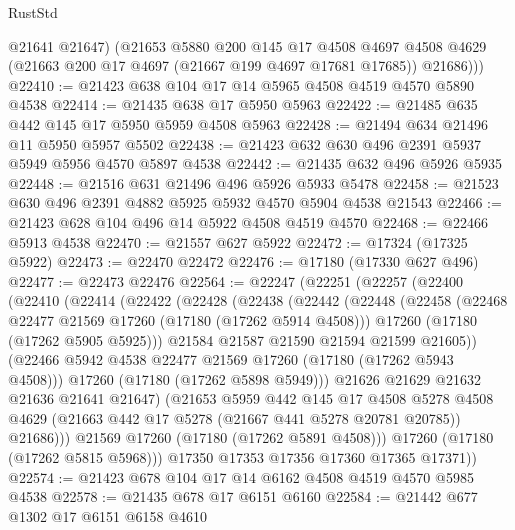 \begin{lexlean}{RustStd}
\begin{coremodule}
          @21641
          @21647)
        (@21653
          @5880
          @200
          @145
          @17
          @4508
          @4697
          @4508
          @4629
          (@21663 @200 @17 @4697 (@21667 @199 @4697 @17681 @17685))
          @21686)))
@22410 := @21423 @638 @104 @17 @14 @5965 @4508 @4519 @4570 @5890 @4538
@22414 := @21435 @638 @17 @5950 @5963
@22422 := @21485 @635 @442 @145 @17 @5950 @5959 @4508 @5963
@22428 := @21494 @634 @21496 @11 @5950 @5957 @5502
@22438 := @21423 @632 @630 @496 @2391 @5937 @5949 @5956 @4570 @5897 @4538
@22442 := @21435 @632 @496 @5926 @5935
@22448 := @21516 @631 @21496 @496 @5926 @5933 @5478
@22458 := @21523 @630 @496 @2391 @4882 @5925 @5932 @4570 @5904 @4538 @21543
@22466 := @21423 @628 @104 @496 @14 @5922 @4508 @4519 @4570
@22468 := @22466 @5913 @4538
@22470 := @21557 @627 @5922
@22472 := @17324 (@17325 @5922)
@22473 := @22470 @22472
@22476 := @17180 (@17330 @627 @496)
@22477 := @22473 @22476
@22564 := @22247
    (@22251
      (@22257
        (@22400
          (@22410
            (@22414
              (@22422
                (@22428
                  (@22438
                    (@22442
                      (@22448
                        (@22458
                          (@22468 @22477 @21569 @17260 (@17180 (@17262 @5914 @4508)))
                          @17260
                          (@17180 (@17262 @5905 @5925)))
                        @21584
                        @21587
                        @21590
                        @21594
                        @21599
                        @21605))
                    (@22466 @5942 @4538 @22477 @21569 @17260 (@17180 (@17262 @5943 @4508)))
                    @17260
                    (@17180 (@17262 @5898 @5949)))
                  @21626
                  @21629
                  @21632
                  @21636
                  @21641
                  @21647)
                (@21653
                  @5959
                  @442
                  @145
                  @17
                  @4508
                  @5278
                  @4508
                  @4629
                  (@21663 @442 @17 @5278 (@21667 @441 @5278 @20781 @20785))
                  @21686)))
            @21569
            @17260
            (@17180 (@17262 @5891 @4508)))
          @17260
          (@17180 (@17262 @5815 @5968)))
        @17350
        @17353
        @17356
        @17360
        @17365
        @17371))
@22574 := @21423 @678 @104 @17 @14 @6162 @4508 @4519 @4570 @5985 @4538
@22578 := @21435 @678 @17 @6151 @6160
@22584 := @21442 @677 @1302 @17 @6151 @6158 @4610

\end{coremodule}
\end{lexlean}
